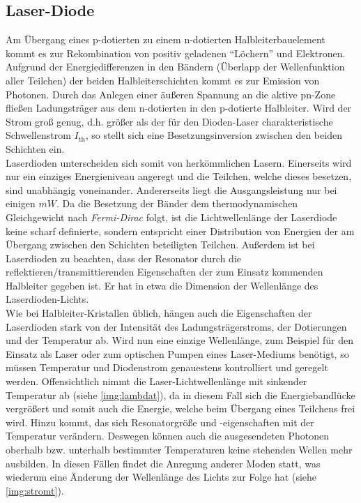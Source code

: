 \documentclass[numbers=noenddot,12pt,a4paper]{scrartcl}
\newcommand{\ix}[1]{_\text{#1}}
\newcommand{\tilt}[1]{\textit{#1}}
\begin{document}
\subsection{Laser-Diode}\label{subsec:dlaser}
Am Übergang eines p-dotierten zu einem n-dotierten Halbleiterbauelement kommt es zur Rekombination von positiv geladenen "`Löchern"' und Elektronen. Aufgrund der Energiedifferenzen in den Bändern (Überlapp der Wellenfunktion aller Teilchen) der beiden Halbleiterschichten kommt es zur Emission von Photonen. Durch das Anlegen einer äußeren Spannung an die aktive pn-Zone fließen Ladungsträger aus dem n-dotierten in den p-dotierte Halbleiter. Wird der Strom groß genug, d.h. größer als der für den Dioden-Laser charakteristische Schwellenstrom $I\ix{th}$, so stellt sich eine Besetzungsinversion zwischen den beiden Schichten ein.
\\Laserdioden unterscheiden sich somit von herkömmlichen Lasern. Einerseits wird nur ein einziges Energieniveau angeregt und die Teilchen, welche dieses besetzen, sind unabhängig voneinander. Andererseits liegt die Ausgangsleistung nur bei einigen $\unit{mW}$. Da die Besetzung der Bänder dem thermodynamischen Gleichgewicht nach \tilt{Fermi-Dirac} folgt, ist die Lichtwellenlänge der Laserdiode keine scharf definierte, sondern entspricht einer Distribution von Energien der am Übergang zwischen den Schichten beteiligten Teilchen. Außerdem ist bei Laserdioden zu beachten, dass der Resonator durch die reflektieren/transmittierenden Eigenschaften der zum Einsatz kommenden Halbleiter gegeben ist. Er hat in etwa die Dimension der Wellenlänge des \mbox{Laserdioden-Lichts}.\\Wie bei Halbleiter-Kristallen üblich, hängen auch die Eigenschaften der Laserdioden stark von der Intensität des Ladungsträgerstroms, der Dotierungen und der Temperatur ab. Wird nun eine einzige Wellenlänge, zum Beispiel für den Einsatz als Laser oder zum optischen Pumpen eines Laser-Mediums benötigt, so müssen Temperatur und Diodenstrom genauestens kontrolliert und geregelt werden. Offensichtlich nimmt die Laser-Lichtwellenlänge mit sinkender Temperatur ab (siehe \ref{img:lambdat}), da in diesem Fall sich die Energiebandlücke vergrößert und somit auch die Energie, welche beim Übergang eines Teilchens frei wird. Hinzu kommt, das sich Resonatorgröße und -eigenschaften mit der Temperatur verändern. Deswegen können auch die ausgesendeten Photonen oberhalb bzw. unterhalb bestimmter Temperaturen keine stehenden Wellen mehr ausbilden. In diesen Fällen findet die Anregung anderer Moden statt, was wiederum eine Änderung der Wellenlänge des Lichts zur Folge hat (siehe \ref{img:stromt}).
\end{document}
